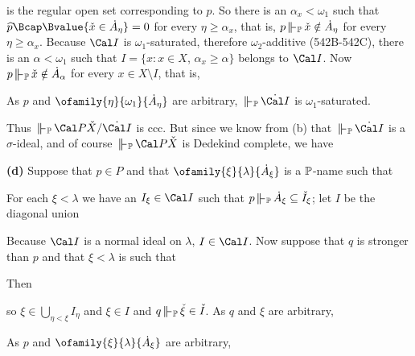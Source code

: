 {

\noindent is the regular open set corresponding to $p$.   So there is an
$\alpha_x<\omega_1$ such that
$\widehat{p}\Bcap\Bvalue{\check x\in\dot A_{\eta}}=0$ for every
$\eta\ge\alpha_x$, that is, $p\VVdP\,\check x\notin\dot A_{\eta}$ for every
$\eta\ge\alpha_x$.    Because $\Cal I$ is $\omega_1$-saturated, therefore
$\omega_2$-additive (542B-542C), there is an $\alpha<\omega_1$ such that
$I=\{x:x\in X$, $\alpha_x\ge\alpha\}$ belongs to $\Cal I$.
Now $p\VVdP\,\check x\notin\dot A_{\alpha}$
for every $x\in X\setminus I$, that is,


\noindent As $p$ and $\ofamily{\eta}{\omega_1}{\dot A_{\eta}}$ are
arbitrary, $\VVdP\,\dot{\Cal I}$ is $\omega_1$-saturated.

Thus $\VVdP\,\Cal P\check X/\dot{\Cal I}$ is ccc.   But since we know from
(b) that $\VVdP\,\dot{\Cal I}$ is a $\sigma$-ideal, and of course
$\VVdP\,\Cal P\check X$ is Dedekind complete, we have


\medskip

{\bf (d)} Suppose that $p\in P$ and that
$\ofamily{\xi}{\lambda}{\dot A_{\xi}}$ is a $\Bbb P$-name such that


\noindent For each $\xi<\lambda$ we have an $I_{\xi}\in\Cal I$ such that
$p\VVdP\,\dot A_{\xi}\subseteq\check I_{\xi}$;  let $I$ be the diagonal
union


\noindent Because $\Cal I$ is a normal ideal on $\lambda$, $I\in\Cal I$.
Now suppose that $q$ is stronger than $p$ and that $\xi<\lambda$ is such
that


\noindent Then


\noindent so $\xi\in\bigcup_{\eta<\xi}I_{\eta}$ and $\xi\in I$ and
$q\VVdP\,\check\xi\in\check I$.   As $q$ and $\xi$ are arbitrary,


\noindent As $p$ and $\ofamily{\xi}{\lambda }{\dot A_{\xi}}$ are arbitrary,

}%


